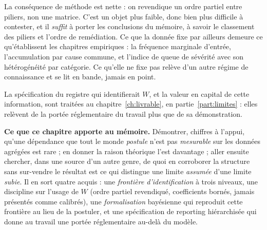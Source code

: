 \vspace{4pt}
La conséquence de méthode est nette : on revendique un ordre partiel entre piliers, non
une matrice. C'est un objet plus faible, donc bien plus difficile à contester, et il \emph{suffit}
à porter les conclusions du mémoire, à savoir le classement des piliers et l'ordre de
remédiation. Ce que la donnée fixe par ailleurs demeure ce qu'établissent les chapitres
empiriques : la fréquence marginale d'entrée, l'accumulation par cause commune, et l'indice de
queue de sévérité avec son hétérogénéité par catégorie. Ce qu'elle ne fixe pas relève d'un autre
régime de connaissance et se lit en bande, jamais en point.

La spécification du registre qui identifierait $W$, et la valeur en capital de cette
information, sont traitées au chapitre~\ref{ch:livrable}, en partie~\ref{part:limites} : elles
relèvent de la portée réglementaire du travail plus que de sa démonstration.

\begin{cle}
\textbf{Ce que ce chapitre apporte au mémoire.} Démontrer, chiffres à l'appui, qu'une dépendance
que tout le monde \emph{postule} n'est pas \emph{mesurable} sur les données agrégées est rare ;
en donner la raison théorique l'est davantage ; aller ensuite chercher, dans une source d'un
autre genre, de quoi en corroborer la structure sans sur-vendre le résultat est ce qui distingue
une limite \emph{assumée} d'une limite \emph{subie}. Il en sort quatre acquis : une
\emph{frontière d'identification} à trois niveaux, une discipline sur l'usage de $W$
(ordre partiel revendiqué, coefficients bornés, jamais présentés comme calibrés), une
\emph{formalisation} bayésienne qui reproduit cette frontière au lieu de la postuler, et une
spécification de reporting hiérarchisée qui donne au travail une portée réglementaire
au-delà du modèle.
\end{cle}




